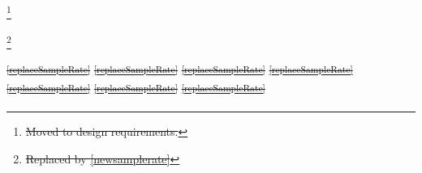 \documentclass[a4paper,12pt,twoside]{article}
\providecommand{\DIFdeltex}[1]{{\protect\color{red}\sout{#1}}}                      %
\providecommand{\DIFdelbegin}{} %
\providecommand{\DIFdel}[1]{\texorpdfstring{\DIFdeltex{#1}}{}} %
\newcommand{\DIFscaledelfig}{0.5}
\newlength{\DIFdelgraphicswidth} %
\newlength{\DIFdelgraphicsheight} %
\newcommand{\DIFdelincludegraphics}[2][]{%
\sbox{\DIFdelgraphicsbox}{\DIFOincludegraphics[#1]{#2}}%
\settoboxwidth{\DIFdelgraphicswidth}{\DIFdelgraphicsbox} %
\settoboxtotalheight{\DIFdelgraphicsheight}{\DIFdelgraphicsbox} %
\scalebox{\DIFscaledelfig}{%
\parbox[b]{\DIFdelgraphicswidth}{\usebox{\DIFdelgraphicsbox}\\[-\baselineskip] \rule{\DIFdelgraphicswidth}{0em}}\llap{\resizebox{\DIFdelgraphicswidth}{\DIFdelgraphicsheight}{%
\setlength{\unitlength}{\DIFdelgraphicswidth}%
\begin{picture}(1,1)%
\thicklines\linethickness{2pt} %
{\color[rgb]{1,0,0}\put(0,0){\framebox(1,1){}}}%
{\color[rgb]{1,0,0}\put(0,0){\line( 1,1){1}}}%
{\color[rgb]{1,0,0}\put(0,1){\line(1,-1){1}}}%
\end{picture}%
}\hspace*{3pt}}} %
} %
\DeclareRobustCommand{\DIFdelbegin}{\DIFOdelbegin \let\includegraphics\DIFdelincludegraphics} %
\begin{document}
\DIFdelbegin %
\footnote{\DIFdel{Moved to design requirements.}%
}
\addtocounter{footnote}{-1}%
\footnote{\DIFdel{Replaced by \ref{newsamplerate}}%
}
\addtocounter{footnote}{-1}%
\DIFdel{\textsuperscript{\ref{replaceSampleRate}}
    }%
\DIFdel{\textsuperscript{\ref{replaceSampleRate}}
    }%
\DIFdel{\textsuperscript{\ref{replaceSampleRate}}
    }%
\DIFdel{\textsuperscript{\ref{replaceSampleRate}}
    }%
\DIFdel{\textsuperscript{\ref{replaceSampleRate}}
    }%
\DIFdel{\textsuperscript{\ref{replaceSampleRate}}
    }%
\DIFdel{\textsuperscript{\ref{replaceSampleRate}}
    }%
\end{document}
